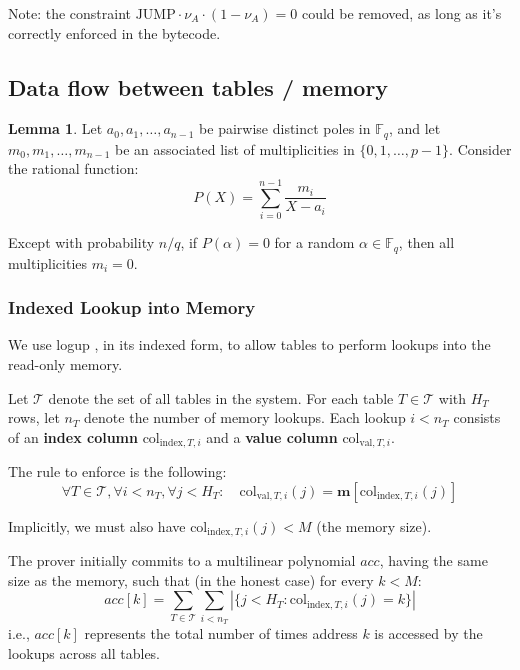 \documentclass{article}
\theoremstyle{definition}
\newcommand{\Fq}{\mathbb F_q}
\newtheorem{lemma}{Lemma}
\begin{document}
Note: the constraint $\text{JUMP} \cdot \nu_A \cdot (1 - \nu_A) = 0$ could be removed, as long as it's correctly enforced in the bytecode.

\subsection{Data flow between tables / memory}


\begin{lemma}
    Let $a_0, a_1, \ldots, a_{n-1}$ be pairwise distinct poles in $\Fq$, and let $m_0, m_1, \ldots, m_{n-1}$ be an associated list of multiplicities in $\{0, 1, \dots, p - 1\}$. Consider the rational function:
$$P(X) = \sum_{i=0}^{n-1} \frac{m_i}{X - a_i}$$

Except with probability $n/q$, if $P(\alpha) = 0$ for a random $\alpha \in \Fq$, then all multiplicities $m_i = 0$.

\end{lemma}

\subsubsection{Indexed Lookup into Memory}

We use logup \cite{logup}, in its indexed form, to allow tables to perform lookups into the read-only memory.


\vspace{3mm}

Let $\mathcal{T}$ denote the set of all tables in the system. For each table $T \in \mathcal{T}$ with $H_T$ rows, let $n_T$ denote the number of memory lookups. Each lookup $i < n_T$ consists of an \textbf{index column} $\text{col}_{\text{index},T,i}$ and a \textbf{value column} $\text{col}_{\text{val},T,i}$.

\vspace{3mm}

The rule to enforce is the following:
$$\forall T \in \mathcal{T}, \forall i < n_T, \forall j < H_T: \quad \text{col}_{\text{val},T,i}(j) = \textbf{m}[\text{col}_{\text{index},T,i}(j)]$$

Implicitly, we must also have $\text{col}_{\text{index},T,i}(j) < M$ (the memory size).

\vspace{3mm}

The prover initially commits to a multilinear polynomial $\textit{acc}$, having the same size as the memory, such that (in the honest case) for every $k < M$:
$$\textit{acc}[k] = \sum_{T \in \mathcal{T}} \sum_{i < n_T} \left| \{ j < H_T : \text{col}_{\text{index},T,i}(j) = k \} \right|$$
i.e., $\textit{acc}[k]$ represents the total number of times address $k$ is accessed by the lookups across all tables.
\end{document}
